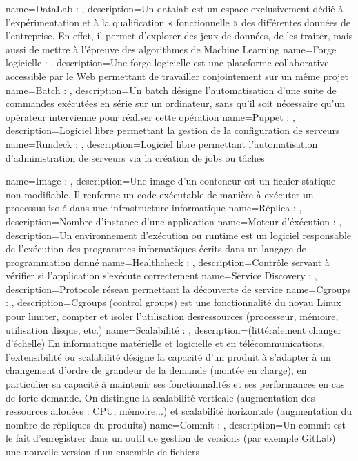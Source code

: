 {
    name=DataLab : ,
    description={Un datalab est un espace exclusivement dédié à l’expérimentation et à la qualification « fonctionnelle » des différentes données de l’entreprise. En effet, il permet d’explorer des jeux de données, de les traiter, mais aussi de mettre à l’épreuve des algorithmes de Machine Learning}
}
{
    name=Forge logicielle : ,
    description={Une forge logicielle est une plateforme collaborative accessible par le Web permettant de travailler conjointement sur un même projet}
}
{
    name=Batch : ,
    description={Un batch désigne l’automatisation d’une suite de commandes exécutées en série sur un ordinateur, sans qu’il soit nécessaire qu’un opérateur intervienne pour réaliser cette opération}
}
{
    name=Puppet : ,
    description={Logiciel libre permettant la gestion de la configuration de serveurs}
}
{
    name=Rundeck : ,
    description={Logiciel libre permettant l’automatisation d’administration de serveurs via la création de jobs ou tâches}
}

{
    name=Image : ,
    description={Une image d'un conteneur est un fichier statique non modifiable. Il renferme un code exécutable de manière à exécuter un processus isolé dans une infrastructure informatique}
}
{
    name=Réplica : ,
    description={Nombre d’instance d’une application}
}
{
    name=Moteur d'éxécution : ,
    description={Un environnement d’exécution ou runtime est un logiciel responsable de l’exécution des programmes informatiques écrits dans un langage de programmation donné}
}
{
    name=Healthcheck : ,
    description={Contrôle servant à vérifier si l’application s’exécute correctement}
}
{
    name=Service Discovery : ,
    description={Protocole réseau permettant la découverte de service}
}
{
    name=Cgroups : ,
    description={Cgroups (control groups) est une fonctionnalité du noyau Linux pour limiter, compter et isoler l’utilisation desressources (processeur, mémoire, utilisation disque, etc.)}
}
{
    name=Scalabilité : ,
    description={(littéralement changer d'échelle) En informatique matérielle et logicielle et en télécommunications, l’extensibilité ou scalabilité désigne la capacité d'un produit à s'adapter à un changement d'ordre de grandeur de la demande (montée en charge), en particulier sa capacité à maintenir ses fonctionnalités et ses performances en cas de forte demande. On distingue la scalabilité verticale (augmentation des ressources allouées :  CPU, mémoire...) et scalabilité horizontale (augmentation du nombre de répliques du produits)}
}
{
    name=Commit : ,
    description={Un commit est le fait d’enregistrer dans un outil de gestion de versions (par exemple GitLab) une nouvelle version d’un ensemble de fichiers}
}

